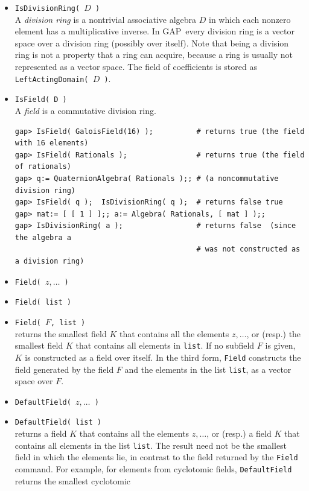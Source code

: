 \documentclass[11pt]{amsart}
\newcommand{\gap}{GAP}   %
\theoremstyle{plain}
\newcommand{\codesize}{\footnotesize}
\newcommand{\<}{\ensuremath{\langle}}
\renewcommand{\>}{\ensuremath{\rangle}}
\begin{document}
\begin{itemize}
\item {\tt IsDivisionRing( $D$ )}\\
A \emph{division ring} is a nontrivial associative algebra $D$ in which each nonzero
element has a multiplicative inverse. 
In \gap\ every division ring is a vector space over a division ring (possibly over
itself). Note that being a division ring is not a property that a ring can acquire,
because a ring is usually not represented as a vector space. 
The field of coefficients is stored as {\tt LeftActingDomain( $D$ )}.

\item {\tt IsField( D )}\\
A \emph{field} is a commutative division ring.
{\codesize
\begin{verbatim}
gap> IsField( GaloisField(16) );          # returns true (the field with 16 elements)
gap> IsField( Rationals );                # returns true (the field of rationals)
gap> q:= QuaternionAlgebra( Rationals );; # (a noncommutative division ring)
gap> IsField( q );  IsDivisionRing( q );  # returns false true
gap> mat:= [ [ 1 ] ];; a:= Algebra( Rationals, [ mat ] );;
gap> IsDivisionRing( a );                 # returns false  (since the algebra a
                                          # was not constructed as a division ring)
\end{verbatim}}
\item {\tt Field( $z,\dots$ )}
\item {\tt Field( list )}
\item {\tt Field( $F$, list )}\\
returns the smallest field $K$ that contains all the elements $z,\dots$, or (resp.) the
smallest field $K$ that contains all elements in {\tt list}. 
If no subfield $F$ is given, $K$ is constructed as a field over itself. In the third form, {\tt Field} constructs the field generated
by the field $F$ and the elements in the list {\tt list}, as a vector space over $F$.
\item {\tt DefaultField( $z,\dots$ )}
\item {\tt DefaultField( list )}\\
returns a field $K$ that contains all the elements $z, \dots$, or (resp.) a field $K$ that contains all elements
in the list {\tt list}.  The result need not be the smallest field in which the elements lie, 
in contrast to the field returned by the {\tt Field} command. For example, for
elements from cyclotomic fields, {\tt DefaultField} returns the smallest cyclotomic

\end{itemize}
\end{document}
